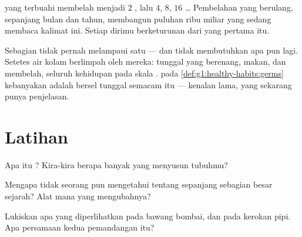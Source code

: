 \begin{example}\label{ex:g5:first-look-at-cells:one}
 yang terbuahi membelah menjadi $2$ , lalu $4$, $8$,
$16$ \dots{} Pembelahan yang berulang, sepanjang bulan dan tahun,
membangun puluhan ribu miliar  yang sedang membaca kalimat ini.
Setiap  dirimu berketurunan dari  yang pertama itu.
\end{example}

\begin{remark}\label{rem:g5:first-look-at-cells:onecelled}
Sebagian  tidak pernah melampaui satu  --- dan tidak
membutuhkan apa pun lagi. Setetes air kolam berlimpah oleh mereka: 
tunggal yang berenang, makan, dan membelah, seluruh kehidupan pada
skala .  pada \cref{def:g1:healthy-habits:germs}
kebanyakan adalah  bersel tunggal semacam itu --- kenalan
lama, yang sekarang punya penjelasan.
\end{remark}

\section{Latihan}

\begin{exercise}[$\star$]\label{exo:g5:first-look-at-cells:1}
Apa itu ? Kira-kira berapa banyak yang menyusun tubuhmu?
\end{exercise}

\begin{exercise}[$\star$]\label{exo:g5:first-look-at-cells:2}
Mengapa tidak seorang pun mengetahui tentang  sepanjang sebagian
besar sejarah? Alat mana yang mengubahnya?
\end{exercise}

\begin{exercise}[$\star$]\label{exo:g5:first-look-at-cells:3}
Lukiskan apa yang diperlihatkan  pada  bawang bombai,
dan pada kerokan pipi. Apa persamaan kedua pemandangan itu?
\end{exercise}

